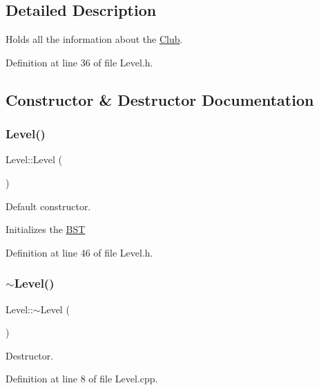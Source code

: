 \subsection{Detailed Description}
Holds all the information about the \hyperlink{class_club}{Club}. 

Definition at line 36 of file Level.\+h.



\subsection{Constructor \& Destructor Documentation}
\hypertarget{class_level_a7a696c928ca5d5354db6e50e46d0f67d}{}\label{class_level_a7a696c928ca5d5354db6e50e46d0f67d} 
\subsubsection{\texorpdfstring{Level()}{Level()}\hspace{0.1cm}{\footnotesize\ttfamily [1/2]}}
{\footnotesize\ttfamily Level\+::\+Level (\begin{DoxyParamCaption}{ }\end{DoxyParamCaption})\hspace{0.3cm}{\ttfamily [inline]}}



Default constructor. 

Initializes the \hyperlink{class_b_s_t}{B\+ST} 

Definition at line 46 of file Level.\+h.

\hypertarget{class_level_a249eac1e8f19ff44134efa5e986feaca}{}\label{class_level_a249eac1e8f19ff44134efa5e986feaca} 
\subsubsection{\texorpdfstring{$\sim$\+Level()}{~Level()}}
{\footnotesize\ttfamily Level\+::$\sim$\+Level (\begin{DoxyParamCaption}{ }\end{DoxyParamCaption})\hspace{0.3cm}{\ttfamily [virtual]}}



Destructor. 



Definition at line 8 of file Level.\+cpp.

